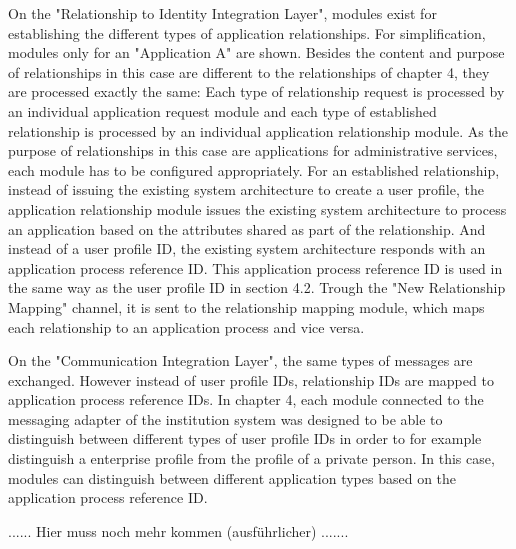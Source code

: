 On the "Relationship to Identity Integration Layer", modules exist for establishing the different types of application relationships. For simplification, modules only for an "Application A" are shown. Besides the content and purpose of relationships in this case are different to the relationships of chapter 4, they are processed exactly the same: Each type of relationship request is processed by an individual application request module and each type of established relationship is processed by an individual application relationship module. As the purpose of relationships in this case are applications for administrative services, each module has to be configured appropriately. For an established relationship, instead of issuing the existing system architecture to create a user profile, the application relationship module issues the existing system architecture to process an application based on the attributes shared as part of the relationship. And instead of a user profile ID, the existing system architecture responds with an application process reference ID. This application process reference ID is used in the same way as the user profile ID in section 4.2. Trough the "New Relationship Mapping" channel, it is sent to the relationship mapping module, which maps each relationship to an application process and vice versa.

On the "Communication Integration Layer", the same types of messages are exchanged. However instead of user profile IDs, relationship IDs are mapped to application process reference IDs. In chapter 4, each module connected to the messaging adapter of the institution system was designed to be able to distinguish between different types of user profile IDs in order to for example distinguish a enterprise profile from the profile of a private person. In this case, modules can distinguish between different application types based on the application process reference ID. 



...... Hier muss noch mehr kommen (ausführlicher) .......